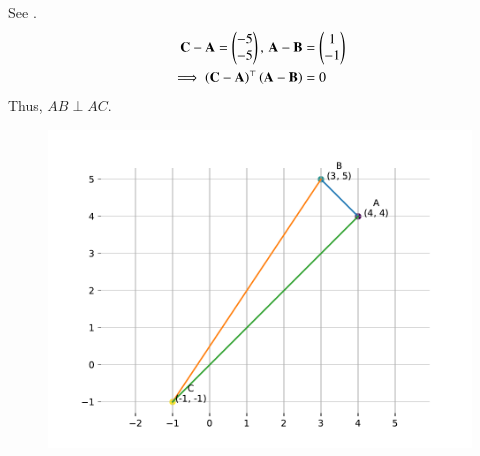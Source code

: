		See .
\begin{align}
	\mathbf{C}-\mathbf{A}=\begin{pmatrix}
-5 \\
	-5\end{pmatrix},\,
	\mathbf{A}-\mathbf{B}&=\begin{pmatrix}
1 \\
-1 
\end{pmatrix}
\\
	\implies \left(\mathbf{C}-\mathbf{A}\right)^{\top}
	\left(\mathbf{A}-\mathbf{B}\right)&=0
\end{align}
Thus, $AB \perp AC$.
	\begin{figure}[H]
		\centering
 \includegraphics[width=0.75\columnwidth]{chapters/11/10/1/6/figs/fig.pdf}
		\caption{}
		\label{fig:11/10/1/6}
  	\end{figure}
